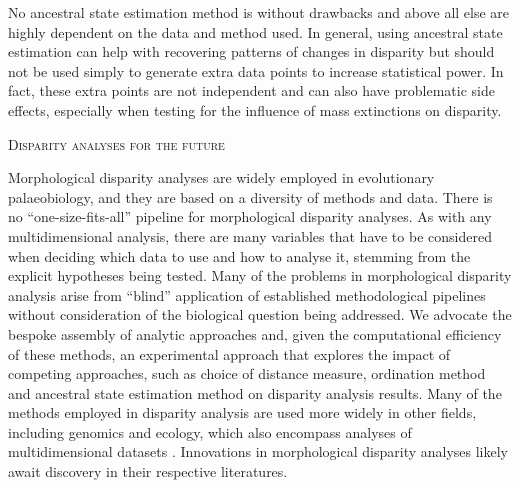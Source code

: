 \documentclass[12pt,letterpaper]{article}
\renewcommand{\section}[1]{%
\bigskip
\begin{center}
\begin{Large}
\normalfont\scshape #1
\medskip
\end{Large}
\end{center}}
\begin{document}
No ancestral state estimation method is without drawbacks
 and above all else are highly dependent on the data and method used.
In general, using ancestral state estimation can help with recovering patterns of changes in disparity but should not be used simply to generate extra data points to increase statistical power.
In fact, these extra points are not independent and can also have problematic side effects, especially when testing for the influence of mass extinctions on disparity.

\section{Disparity analyses for the future}

\noindent Morphological disparity analyses are widely employed in evolutionary palaeobiology, and they are based on a diversity of methods and data.
There is no ``one-size-fits-all'' pipeline for morphological disparity analyses.
As with any multidimensional analysis, there are many variables that have to be considered when deciding which data to use and how to analyse it, stemming from the explicit hypotheses being tested.
Many of the problems in morphological disparity analysis arise from ``blind'' application of established methodological pipelines without consideration of the biological question being addressed.
We advocate the bespoke
assembly of analytic approaches and, given the computational efficiency of these methods, an experimental approach that explores the impact of competing approaches, such as choice of distance measure, ordination method and ancestral state estimation method on disparity analysis results.
Many of the methods employed in disparity analysis are used more widely in other fields, including genomics and ecology, which also encompass analyses of multidimensional datasets
\citep{Donohue2013-bg, Saupe2015-vm, Canter2018-hk, mammola2019}
. %
Innovations in morphological disparity analyses likely await discovery in their respective literatures.
\end{document}
